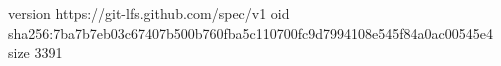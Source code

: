 version https://git-lfs.github.com/spec/v1
oid sha256:7ba7b7eb03c67407b500b760fba5c110700fc9d7994108e545f84a0ac00545e4
size 3391

